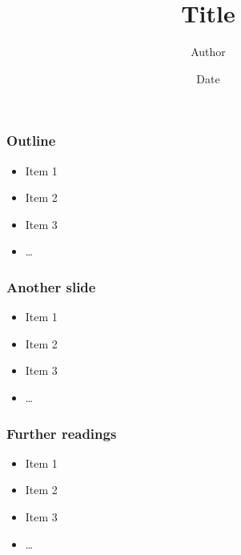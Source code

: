 \documentclass[xcolor={usenames,dvipsnames}]{beamer}
\title{Title}
\author{Author}
\date{Date}
\begin{document}
\frame{\titlepage}

\begin{frame}[fragile]
  \frametitle{Outline}
  \begin{itemize}
  \item Item 1
  \item Item 2
  \item Item 3
  \item \ldots
  \end{itemize}
\end{frame}

\begin{frame}[fragile]
  \frametitle{Another slide}
  \begin{itemize}
  \item Item 1
  \item Item 2
  \item Item 3
  \item \ldots
  \end{itemize}
\end{frame}

\begin{frame}[fragile]
  \frametitle{Further readings}
  \begin{itemize}
  \item Item 1
  \item Item 2
  \item Item 3
  \item \ldots
  \end{itemize}
\end{frame}
\end{document}

